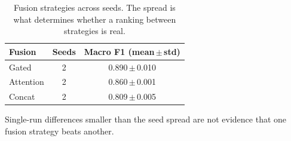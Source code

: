 \begin{table}[t]
\caption{Fusion strategies across seeds. The spread is what determines whether a ranking between strategies is real.}
\label{tab:fusion_variance}
\centering\footnotesize
\setlength\tabcolsep{5pt}
\begin{tabular}{lcc}
\toprule
\textbf{Fusion} & Seeds & \textbf{Macro F1 (mean\,$\pm$\,std)}\\
\midrule
Gated & 2 & 0.890\,$\pm$\,0.010 \\
Attention & 2 & 0.860\,$\pm$\,0.001 \\
Concat & 2 & 0.809\,$\pm$\,0.005 \\
\bottomrule
\end{tabular}
\vspace{1pt}

{\scriptsize Single-run differences smaller than the seed spread are not evidence that one fusion strategy beats another.}
\end{table}
